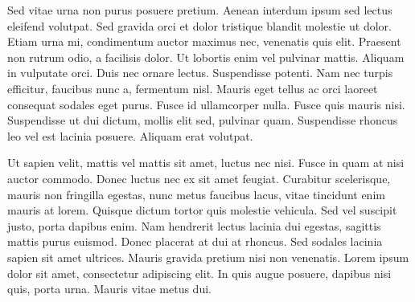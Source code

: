 \documentclass{article}
\newcommand{\voiceshrink}{-5mm}
\newenvironment{MC}
               {\begin{tcolorbox}[enhanced,
                     breakable,
                     parbox=false,
                     colback=voice-bg,
                     colframe=voice-frame,
                     grow to left by=\voiceshrink,
                     attach boxed title to top right={xshift=-5mm,
                       yshift=-3mm,
                       yshifttext=-1mm},
                     coltitle=black,
                     colbacktitle=voice-title-bg,
                     title=MC,
                     boxed title style={size=small,
                       colframe=black}]}
               {\end{tcolorbox}}
\begin{document}
\begin{MC}

Sed vitae urna non purus posuere pretium. Aenean interdum ipsum sed lectus eleifend volutpat. Sed gravida orci et dolor tristique blandit molestie ut dolor. Etiam urna mi, condimentum auctor maximus nec, venenatis quis elit. Praesent non rutrum odio, a facilisis dolor. Ut lobortis enim vel pulvinar mattis. Aliquam in vulputate orci. Duis nec ornare lectus. Suspendisse potenti. Nam nec turpis efficitur, faucibus nunc a, fermentum nisl. Mauris eget tellus ac orci laoreet consequat sodales eget purus. Fusce id ullamcorper nulla. Fusce quis mauris nisi. Suspendisse ut dui dictum, mollis elit sed, pulvinar quam. Suspendisse rhoncus leo vel est lacinia posuere. Aliquam erat volutpat.

Ut sapien velit, mattis vel mattis sit amet, luctus nec nisi. Fusce in quam at nisi auctor commodo. Donec luctus nec ex sit amet feugiat. Curabitur scelerisque, mauris non fringilla egestas, nunc metus faucibus lacus, vitae tincidunt enim mauris at lorem. Quisque dictum tortor quis molestie vehicula. Sed vel suscipit justo, porta dapibus enim. Nam hendrerit lectus lacinia dui egestas, sagittis mattis purus euismod. Donec placerat at dui at rhoncus. Sed sodales lacinia sapien sit amet ultrices. Mauris gravida pretium nisi non venenatis. Lorem ipsum dolor sit amet, consectetur adipiscing elit. In quis augue posuere, dapibus nisi quis, porta urna. Mauris vitae metus dui.

\end{MC}
\end{document}
